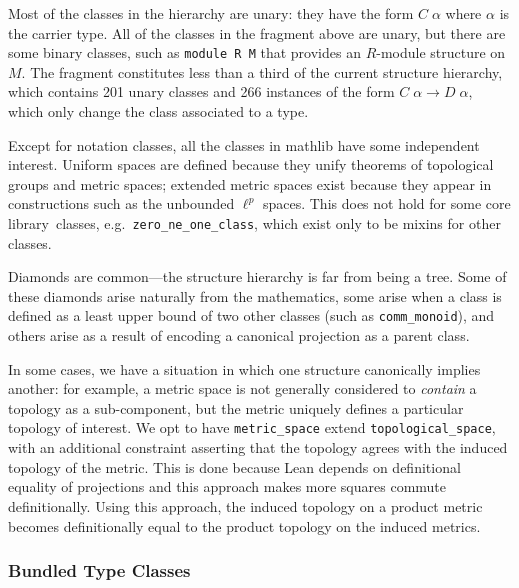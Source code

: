 \documentclass[sigplan]{acmart}\settopmatter{}
\newcommand{\mathlib}{\textsf{mathlib}\xspace}
\newcommand{\corelib}{\textsf{core} library\xspace}
\begin{document}
Most of the classes in the hierarchy are unary: they have the form $C\;\alpha$ where $\alpha$ is the carrier type.
All of the classes in the fragment above are unary, but there are some binary classes, such as \lstinline{module R M} that provides an $R$-module structure on $M$.
The fragment constitutes less than a third of the current structure hierarchy, which contains 201 unary classes and 266 instances of the form $C \; \alpha \to D \; \alpha$, which only change the class associated to a type.

Except for notation classes, all the classes in \mathlib have some independent interest.
Uniform spaces are defined because they unify theorems of topological groups and metric spaces; extended metric spaces exist because they appear in constructions such as the unbounded $\ell^p$ spaces.
This does not hold for some \corelib\ classes, e.g.\ \lstinline{zero_ne_one_class}, which exist only to be mixins for other classes.

Diamonds are common---the structure hierarchy is far from being a tree.
Some of these diamonds arise naturally from the mathematics, some arise when a class is defined as a least upper bound of two other classes (such as \lstinline{comm_monoid}), and others arise as a result of encoding a canonical projection as a parent class.

In some cases, we have a situation in which one structure canonically implies another: for example, a metric space is not generally considered to \emph{contain} a topology as a sub-component, but the metric uniquely defines a particular topology of interest.
We opt to have \lstinline{metric_space} extend \lstinline{topological_space}, with an additional constraint asserting that the topology agrees with the induced topology of the metric.
This is done because Lean depends on definitional equality of projections and this approach makes more squares commute definitionally.
Using this approach, the induced topology on a product metric becomes definitionally equal to the product topology on the induced metrics.


\subsubsection{Bundled Type Classes}
\end{document}
